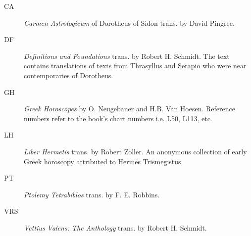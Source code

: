 \begin{description}
\item[CA]
	\textit{Carmen Astrologicum} of Dorotheus of Sidon trans. by David Pingree.
\item[DF]
	\textit{Definitions and Foundations} trans. by Robert H. Schmidt. The text contains translations of texts from Thrasyllus and Serapio who were near contemporaries of Dorotheus.
\item[GH] 
	\textit{Greek Horoscopes} by O. Neugebauer and H.B. Van Hoesen. Reference numbers refer to the book's chart numbers i.e. L50, L113, etc.
\item[LH]
	\textit{Liber Hermetis} trans. by Robert Zoller. An anonymous collection of early Greek horoscopy attributed to Hermes Trismegistus.
\item[PT]
	\textit{Ptolemy Tetrabiblos} trans. by F. E. Robbins.
\item[VRS] \textit{Vettius Valens: The Anthology} trans. by Robert H. Schmidt.	

\end{description}

\newpage